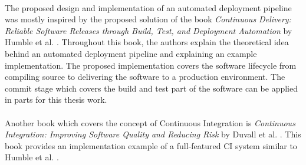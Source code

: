 \paragraph{}The proposed design and implementation of an automated deployment pipeline was mostly inspired by the proposed solution of the book \textit{Continuous Delivery: Reliable Software Releases through Build, Test, and Deployment Automation} by Humble et al. \cite{Farley2010CI}.
Throughout this book, the authors explain the theoretical idea behind an automated deployment pipeline and explaining an example implementation.
The proposed implementation covers the software lifecycle from compiling source to delivering the software to a production environment.
The commit stage which covers the build and test part of the software can be applied in parts for this thesis work.


\paragraph{}Another book which covers the concept of Continuous Integration is \textit{Continuous Integration: Improving Software Quality and Reducing Risk} by Duvall et al. \cite{Duvall2007CI}. This book provides an implementation example of a full-featured CI system similar to Humble et al. \cite{Farley2010CI}.
